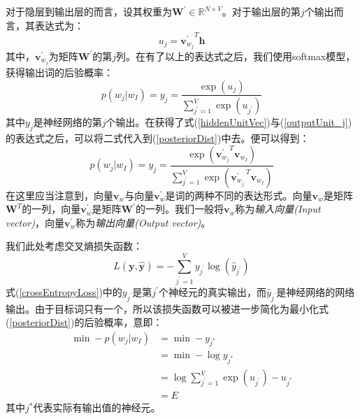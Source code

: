 \documentclass[UTF8, 12pt]{ctexart}
\begin{document}
	对于隐层到输出层的而言，设其权重为$\textbf{W}^{'} \in \mathbb{R}^{N \times V}$。对于输出层的第$j$个输出而言，其表达式为：
	\begin{equation}
		\label{outputUnit_j}
		u_{j} = {\textbf{v}^{'}_{w_{j}}}^{T} \textbf{h}
	\end{equation}
	其中，$\textbf{v}^{'}_{w_{j}}$为矩阵$\textbf{W}^{'}$的第$j$列。在有了以上的表达式之后，我们使用softmax模型，获得输出词的后验概率：
	\begin{equation}
		\label{posteriorDist}
		p(w_{j}|w_{I}) = y_{j} = \frac{\exp(u_{j})}{\sum_{j^{'} = 1}^{V} \exp(u_{j^{'}})}
	\end{equation}
	其中$y_{j}$是神经网络的第$j$个输出。在获得了式(\ref{hiddenUnitVec})与(\ref{outputUnit_j})的表达式之后，可以将二式代入到(\ref{posteriorDist})中去。便可以得到：
	\begin{equation}
		p(w_{j}|w_{I}) = y_{j} = \frac{\exp({\textbf{v}^{'}_{w_{j}}}^{T} \textbf{v}_{w_{I}})}{\sum_{j^{'} = 1}^{V} \exp({\textbf{v}^{'}_{w_{j^{'}}}}^{T} \textbf{v}_{w_{I}})}
	\end{equation}
	在这里应当注意到，向量$\textbf{v}_{w}$与向量$\textbf{v}^{'}_{w}$是词的两种不同的表达形式。向量$\textbf{v}_{w}$是矩阵$\textbf{W}^{T}$的一列，向量$\textbf{v}^{'}_{w}$是矩阵$\textbf{W}^{'}$的一列。我们一般将$\textbf{v}_{w}$称为\emph{输入向量(Input vector)}，向量$\textbf{v}^{'}_{w}$称为\emph{输出向量(Output vector)}。
	
	我们此处考虑交叉熵损失函数：
	\begin{equation}
		\label{crossEntropyLoss}
		L(\textbf{y}, \hat{\textbf{y}}) = -\sum_{j^{'} = 1}^{V} y_{j^{'}}\log(\hat{y}_{j^{'}})
	\end{equation}
	式(\ref{crossEntropyLoss})中的$y_{j^{'}}$是第$j^{'}$个神经元的真实输出，而$\hat{y}_{j^{'}}$是神经网络的网络输出。由于目标词只有一个，所以该损失函数可以被进一步简化为最小化式(\ref{posteriorDist})的后验概率，意即：
	\begin{align}
		\min - {p(w_{j}|w_{I})} & = \min - y_{j^{*}} \\
							    & = \min - \log y_{j^{*}} \\
							    & = \log \sum_{j^{'} = 1}^{V} \exp(u_{j^{'}}) - u_{j^{*}} \\
							    & = E
	\end{align}
	其中$j^{*}$代表实际有输出值的神经元。
	
\end{document}
